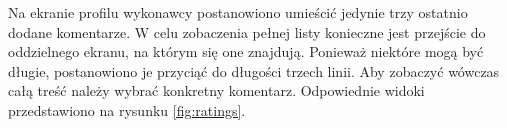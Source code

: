Na ekranie profilu wykonawcy postanowiono umieścić jedynie trzy ostatnio dodane komentarze. W celu zobaczenia pełnej listy konieczne jest przejście do oddzielnego ekranu, na którym się one znajdują. Ponieważ niektóre mogą być długie, postanowiono je przyciąć do długości trzech linii. Aby zobaczyć wówczas całą treść należy wybrać konkretny komentarz. Odpowiednie widoki przedstawiono na rysunku \ref{fig:ratings}.

\begin{figure}[ht!]
  \captionsetup[subfigure]{justification=centering}
  \centering
  \begin{subfigure}[t]{0.32\textwidth}
    \centering

\end{subfigure}
\end{figure}
